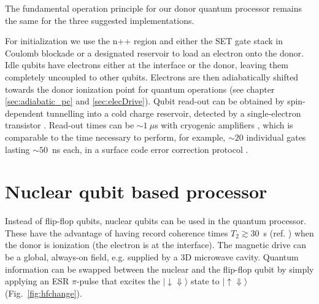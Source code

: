 The fundamental operation principle for our donor quantum processor remains the same for the three suggested implementations. 

For initialization we use the n++ region and either the SET gate stack in Coulomb blockade or a designated reservoir to load an electron onto the donor. 
Idle qubits have electrons either at the interface or the donor, leaving them completely uncoupled to other qubits. Electrons are then adiabatically shifted towards the donor ionization point for quantum operations (see chapter \ref{sec:adiabatic_pc} and \ref{sec:elecDrive}).
Qubit read-out can be obtained by spin-dependent tunnelling into a cold charge reservoir, detected by a single-electron transistor \cite{Morello2010}. Read-out times can be $\sim1~\mu$s with cryogenic amplifiers \cite{Curry2015}, which is comparable to the time necessary to perform, for example, $\sim 20$ individual gates lasting $\sim 50$~ns each, in a surface code error correction protocol \cite{Fowler2012}.

\section{Nuclear qubit based processor}

Instead of flip-flop qubits, nuclear qubits can be used in the quantum processor. These have the advantage of having record coherence times $T_2 \gtrsim 30$~s (ref. \cite{Muhonen2014}) when the donor is ionization (the electron is at the interface). The magnetic drive can be a global, always-on field, e.g. supplied by a 3D microwave cavity. Quantum information can be swapped between the nuclear and the flip-flop qubit by simply applying an ESR $\pi$-pulse that excites the $\lvert{\downarrow\Downarrow}\rangle$ state to $\lvert{\uparrow\Downarrow}\rangle$ (Fig.~\ref{fig:hfchange}).
